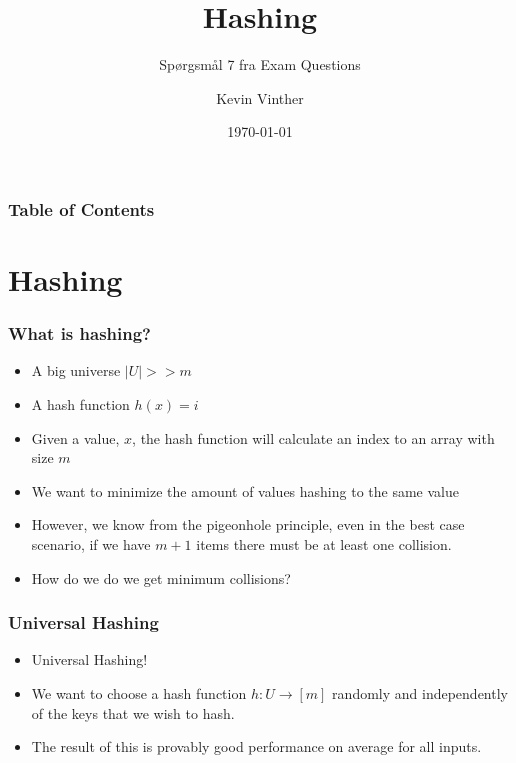 \documentclass{beamer}
\title{Hashing}
\subtitle{Spørgsmål 7 fra Exam Questions}
\author{Kevin Vinther}
\date{\today}
\begin{document}
\begin{frame}
  \titlepage
\end{frame}

\begin{frame}[allowframebreaks]
  \frametitle{Table of Contents}
  \tableofcontents
\end{frame}

\section{Hashing}
\label{sec:hashing}

\begin{frame}[allowframebreaks]
  \frametitle{What is hashing?}
   \begin{itemize}
   \item A big universe $|U| >> m$
   \item A hash function $h(x) = i$
   \item Given a value, $x$, the hash function will calculate an index to an array with size $m$
   \item We want to minimize the amount of values hashing to the same value
   \item However, we know from the pigeonhole principle, even in the best case scenario, if we have $m+1$ items there must be at least one collision.
   \item How do we do we get minimum collisions?
   \end{itemize}
\end{frame}

\begin{frame}
  \frametitle{Universal Hashing}
  \begin{itemize}
  \item Universal Hashing!
  \item We want to choose a hash function $h : U \rightarrow [m]$ randomly and independently of the keys that we wish to hash.
  \item The result of this is provably good performance on average for all inputs.
  \end{itemize}
\end{frame}
\end{document}
